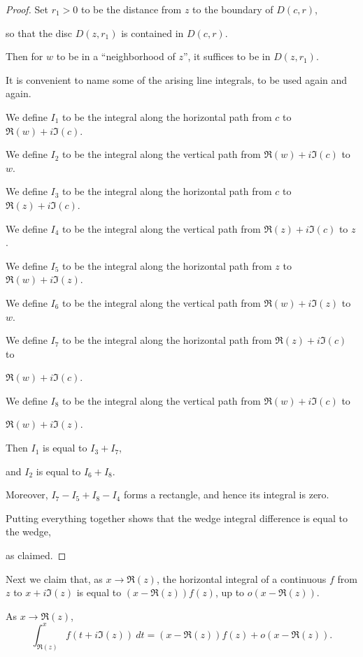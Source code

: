  \begin{proof}

 Set $r_1>0$ to be the distance from $z$ to the boundary of $D(c,r)$,

 so that the disc $D(z,r_1)$ is contained in $D(c,r)$.

 Then for $w$ to be in a ``neighborhood of $z$'', it suffices to be in $D(z,r_1)$.

 It is convenient to name some of the arising line integrals, to be used again and again.

 We define $I_1$ to be the integral along the horizontal path from $c$ to $\Re(w)+i\Im(c)$.

 We define $I_2$ to be the integral along the vertical path from $\Re(w)+i\Im(c)$ to $w$.

 We define $I_3$ to be the integral along the horizontal path from $c$ to $\Re(z)+i\Im(c)$.

 We define $I_4$ to be the integral along the vertical path from $\Re(z)+i\Im(c)$ to $z$.

 We define $I_5$ to be the integral along the horizontal path from $z$ to $\Re(w)+i\Im(z)$.

 We define $I_6$ to be the integral along the vertical path from $\Re(w)+i\Im(z)$ to $w$.

 We define $I_7$ to be the integral along the horizontal path from $\Re(z)+i\Im(c)$ to

 $\Re(w)+i\Im(c)$.

 We define $I_8$ to be the integral along the vertical path from $\Re(w)+i\Im(c)$ to

 $\Re(w)+i\Im(z)$.

 Then $I_1$ is equal to $I_3+I_7$,

 and $I_2$ is equal to $I_6+I_8$.

 Moreover, $I_7 - I_5 + I_8 - I_4$ forms a rectangle, and hence its integral is zero.

 Putting everything together shows that the wedge integral difference is equal to the wedge,

 as claimed.

 \end{proof}


Next we claim that, as $x \to \Re(z)$, the horizontal integral of a continuous $f$
from $z$ to $x + i\Im(z)$ is equal to $(x - \Re(z)) f(z)$, up to $o(x - \Re(z))$.
\begin{lemma}
  \label{deriv_of_wedgeInt_re'}
  \leanok
  As $x \to \Re(z)$,
  $$
    \int_{\Re(z)}^x f(t + i\Im(z))\ dt
    =
    (x-\Re(z)) f(z)
    +
    o(x-\Re(z))
    .
  $$
\end{lemma}


